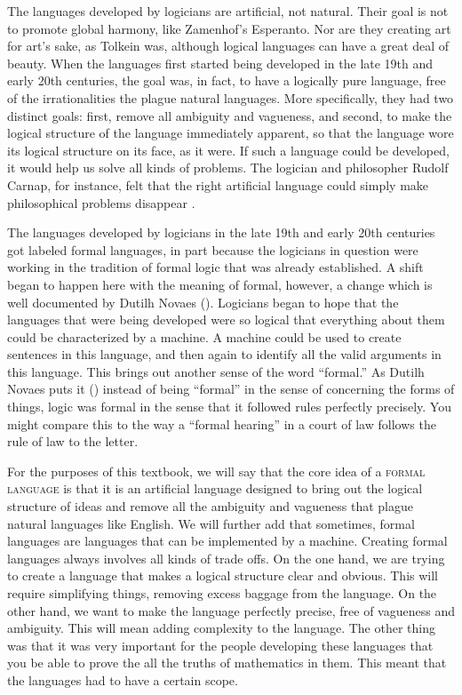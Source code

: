 The languages developed by logicians are artificial, not natural. Their goal is not to promote global harmony, like Zamenhof's Esperanto. Nor are they creating art for art's sake, as Tolkein was, although logical languages can have a great deal of beauty. When the languages first started being developed in the late 19th and early 20th centuries, the goal was, in fact, to have a logically pure language, free of the irrationalities the plague natural languages. More specifically, they had two distinct goals: first, remove all ambiguity and vagueness, and second, to make the logical structure of the language immediately apparent, so that the language wore its logical structure on its face, as it were. If such a language could be developed, it would help us solve all kinds of problems. The logician and philosopher Rudolf Carnap, for instance, felt that the right artificial language could simply make philosophical problems disappear \citep{Carnap1928}.

The languages developed by logicians in the late 19th and early 20th centuries got labeled formal languages, in part because the logicians in question were working in the tradition of formal logic that was already established. A shift began to happen here with the meaning of formal, however, a change which is well documented by Dutilh Novaes  (\cite*{DutilhNovaes2011}). Logicians began to hope that the languages that were being developed were so logical that everything about them could be characterized by a machine. A machine could be used to create sentences in this language, and then again to identify all the valid arguments in this language. This brings out another sense of the word ``formal.'' As Dutilh Novaes puts it (\cite*{DutilhNovaes2011}) instead of being ``formal'' in the sense of concerning the forms of things, logic was formal in the sense that it followed rules perfectly precisely. You might compare this to the way a ``formal hearing'' in a court of law follows the rule of law to the letter. 

For the purposes of this textbook, we will say that the core idea of a  \textsc{\gls{formal language}} \label{def:formal_language} is that it is an artificial language designed to bring out the logical structure of ideas and remove all the ambiguity and vagueness that plague natural languages like English. We will further add that sometimes, formal languages are languages that can be implemented by a machine. Creating formal languages always involves all kinds of trade offs. On the one hand, we are trying to create a language that makes a logical structure clear and obvious. This will require simplifying things, removing excess baggage from the language. On the other hand, we want to make the language perfectly precise, free of vagueness and ambiguity. This will mean adding complexity to the language. The other thing was that it was very important for the people developing these languages that you be able to prove the all the truths of mathematics in them. This meant that the languages had to have a certain scope.

